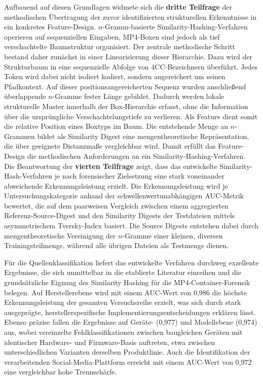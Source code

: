 Aufbauend auf diesen Grundlagen widmete sich die \textbf{dritte Teilfrage} der methodischen Übertragung der zuvor identifizierten strukturellen Erkenntnisse in ein konkretes Feature-Design. \(n\)-Gramm-basierte Similarity-Hashing-Verfahren operieren auf sequenziellen Eingaben, MP4-Boxen sind jedoch als tief verschachtelte Baumstruktur organisiert. Der zentrale methodische Schritt bestand daher zunächst in einer Linearisierung dieser Hierarchie. Dazu wird der Strukturbaum in eine sequenzielle Abfolge von 4CC-Bezeichnern überführt. Jedes Token wird dabei nicht isoliert kodiert, sondern angereichert um seinen Pfadkontext. Auf dieser positionsangereicherten Sequenz wurden anschließend überlappende \(n\)-Gramme fester Länge gebildet. Dadurch werden lokale strukturelle Muster innerhalb der Box-Hierarchie erfasst, ohne die Information über die ursprüngliche Verschachtelungstiefe zu verlieren. Als Feature dient somit die relative Position eines Boxtyps im Baum. Die entstehende Menge an \(n\)-Grammen bildet als Similarity Digest eine mengentheoretische Repräsentation, die über geeignete Distanzmaße vergleichbar wird. Damit erfüllt das Feature-Design die methodischen Anforderungen an ein Similarity-Hashing-Verfahren.\\


Die Beantwortung der \textbf{vierten Teilfrage} zeigt, dass das entwickelte Similarity-Hash-Verfahren je nach forensischer Zielsetzung eine stark voneinander abweichende Erkennungsleistung erzielt. Die Erkennungsleistung wird je Untersuchungskategorie anhand der schwellenwertunabhängigen AUC-Metrik bewertet, die auf dem paarweisen Vergleich zwischen einem aggregierten Referenz-Source-Digest und den Similarity Digests der Testdateien mittels asymmetrischem Tversky-Index basiert. Die Source Digests entstehen dabei durch mengentheoretische Vereinigung der \(n\)-Gramme einer kleinen, diversen Trainingsteilmenge, während alle übrigen Dateien als Testmenge dienen.

Für die Quellenklassifikation liefert das entwickelte Verfahren durchweg exzellente Ergebnisse, die sich unmittelbar in die etablierte Literatur einreihen und die grundsätzliche Eignung des Similarity Hashing für die MP4-Container-Forensik belegen. Auf Herstellerebene wird mit einem AUC-Wert von 0,986 die höchste Erkennungsleistung der gesamten Versuchsreihe erzielt, was sich durch stark ausgeprägte, herstellerspezifische Implementierungsentscheidungen erklären lässt. Ebenso präzise fallen die Ergebnisse auf Geräte- (0,977) und Modellebene (0,974) aus, wobei vereinzelte Fehlklassifikationen zwischen baugleichen Geräten mit identischer Hardware- und Firmware-Basis auftreten, etwa zwischen unterschiedlichen Varianten derselben Produktlinie. Auch die Identifikation der verarbeitenden Social-Media-Plattform erreicht mit einem AUC-Wert von 0,972 eine vergleichbar hohe Trennschärfe. 

